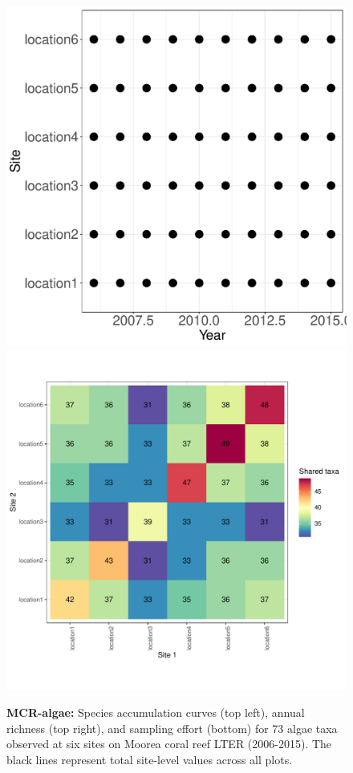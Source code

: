 \documentclass[11pt, oneside]{article}
\begin{document}
\begin{figure}[h!]
\includegraphics[scale = 0.4]{mcr-algae-castorani_spatiotemporal_sampling_effort.pdf}
\includegraphics[scale = 0.4]{mcr-algae-castorani_spp_shared.pdf}
\caption{{\bf MCR-algae:} Species accumulation curves (top left),  annual richness (top right), and sampling effort (bottom)  for 73 algae taxa observed at six sites on Moorea coral reef LTER (2006-2015). The black lines represent total site-level values across all plots.}
\label{mcr-algae}
\end{figure}
%
%
\end{document}
